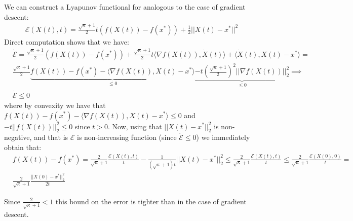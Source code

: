 \documentclass{article}
\begin{document}
We can construct a Lyapunov functional for analogous to the case of gradient descent:
\begin{align*}
    \mathcal{E}(X(t), t) = \frac{\sqrt{\kappa}+1}{2}t(f(X(t)) - f(x^*)) + \frac{1}{2}||X(t)-x^*||^2
\end{align*}
Direct computation shows that we have:
\begin{align*}
    & \dot{\mathcal{E}}= \frac{\sqrt{\kappa}+1}{2}(f(X(t)) - f(x^*)) + \frac{\sqrt{\kappa}+1}{2} t \langle \nabla f(X(t)), \dot{X}(t) \rangle + \langle \dot{X}(t), X(t)-x^* \rangle = \\
    & \frac{\sqrt{\kappa}+1}{2} \underbrace{f(X(t)) - f(x^*) - \langle \nabla f(X(t)), X(t) - x^* \rangle}_{\leq 0} \underbrace{- t (\frac{\sqrt{\kappa}+1}{2})^2 || \nabla f(X(t))||_2^2}_{\leq 0} \implies \\
    & \dot{\mathcal{E}} \leq 0
\end{align*}
where by convexity we have that $f(X(t)) - f(x^*) - \langle \nabla f(X(t)), X(t) - x^* \rangle \leq 0$ and $ - t ||f(X(t))||_2^2 \leq 0$ since $t>0$. Now, using that $||X(t)-x^*||_2^2$ is non-negative, and that is $\mathcal{E}$ is non-increasing function (since $\dot{\mathcal{E}} \leq 0$) we immediately obtain that:
\begin{align*}
    & f(X(t)) - f(x^*) = \frac{2}{\sqrt{\kappa}+1} \frac{\mathcal{E}(X(t), t)}{t} - \frac{1}{(\sqrt{\kappa}+1)t} ||X(t) - x^*||_2^2 \leq \frac{2}{\sqrt{\kappa}+1} \frac{\mathcal{E}(X(t), t)}{t} \leq \frac{2}{\sqrt{\kappa}+1} \frac{\mathcal{E}(X(0), 0)}{t} = \\ & \frac{2}{\sqrt{\kappa}+1} \frac{||X(0)-x^*||_2^2}{2t}
\end{align*}

Since $\frac{2}{\sqrt{\kappa}+1} < 1$ this bound on the error is tighter than in the case of gradient descent.





\end{document}
